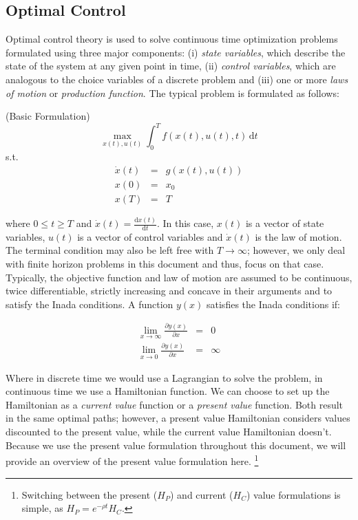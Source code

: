 \label{section:mathappendix}

\subsection{Optimal Control}
\label{subsection:optimalcontrol}

\noindent Optimal control theory is used to solve continuous time optimization problems formulated using three major components: (i) \textit{state variables}, which describe the state of the system at any given point in time, (ii) \textit{control variables}, which are analogous to the choice variables of a discrete problem and (iii) one or more \textit{laws of motion} or \textit{production function}. The typical problem is formulated as follows:


\begin{problem} \label{problem:basicform} (Basic Formulation)
\begin{equation}
\max_{x(t), u(t)} \int_0^T \! f(x(t),u(t),t) \, \mathrm{d}t \label{eq:problem1}
\end{equation}
\noindent s.t.
\begin{eqnarray}
\dot{x}(t) &=& g(x(t),u(t)) \nonumber \\
x(0) &=& x_0 \nonumber \\
x(T) &=& T  \nonumber
\end{eqnarray}
\end{problem}

where $ 0\leq t \geq T $ and $\dot{x}(t) = \frac{\mathrm{d}x(t)}{\mathrm{d}t}$. In this case, $x(t) $ is a vector of state variables, $u(t) $ is a vector of control variables and $ \dot{x}(t) $ is the law of motion. The terminal condition may also be left free with $T \rightarrow \infty$; however, we only deal with finite horizon problems in this document and thus, focus on that case. Typically, the objective function and law of motion are assumed to be continuous, twice differentiable, strictly increasing and concave in their arguments and to satisfy the Inada conditions. A function $y(x)$ satisfies the Inada conditions if: 

\begin{eqnarray}
\lim_{ x \to \infty} \frac{\partial y(x)}{\partial x} &=& 0 \nonumber \\
\lim_{ x \to 0} \frac{\partial y(x)}{\partial x} &=& \infty \nonumber
\end{eqnarray}

Where in discrete time we would use a Lagrangian to solve the problem, in continuous time we use a Hamiltonian function. We can choose to set up the Hamiltonian as a \textit{current value} function or a \textit{present value} function. Both result in the same optimal paths; however, a present value Hamiltonian considers values discounted to the present value, while the current value Hamiltonian doesn't. Because we use the present value formulation throughout this document, we will provide an overview of the present value formulation here. \footnote{Switching between the present ($H_P$) and current ($H_C$) value formulations is simple, as $H_P = e^{-\rho t}H_C $.}

